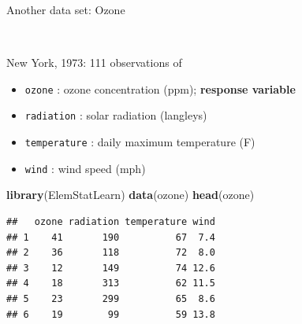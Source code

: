 \documentclass[10pt,ignorenonframetext,]{beamer}
\newenvironment{Shaded}{\begin{snugshade}}{\end{snugshade}}
\newcommand{\KeywordTok}[1]{\textcolor[rgb]{0.13,0.29,0.53}{\textbf{#1}}}
\newcommand{\NormalTok}[1]{#1}
\providecommand{\tightlist}{%
  \setlength{\itemsep}{0pt}\setlength{\parskip}{0pt}}
\begin{document}
\begin{frame}[fragile]

\begin{block}{Another data set: Ozone}

\(~\)

New York, 1973: 111 observations of

\begin{itemize}
\tightlist
\item
  \texttt{ozone} : ozone concentration (ppm); \textbf{response variable}
\item
  \texttt{radiation} : solar radiation (langleys)
\item
  \texttt{temperature} : daily maximum temperature (F)
\item
  \texttt{wind} : wind speed (mph)
\end{itemize}

\small

\begin{Shaded}
\begin{Highlighting}[]
\KeywordTok{library}\NormalTok{(ElemStatLearn)}
\KeywordTok{data}\NormalTok{(ozone)}
\KeywordTok{head}\NormalTok{(ozone)}
\end{Highlighting}
\end{Shaded}

\begin{verbatim}
##   ozone radiation temperature wind
## 1    41       190          67  7.4
## 2    36       118          72  8.0
## 3    12       149          74 12.6
## 4    18       313          62 11.5
## 5    23       299          65  8.6
## 6    19        99          59 13.8
\end{verbatim}

\end{block}

\end{frame}
\end{document}
